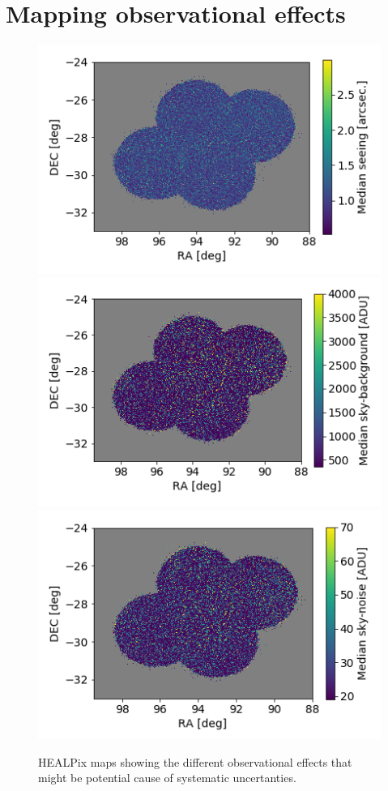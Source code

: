 \documentclass[\docopts]{\docclass}
\begin{document}
\section{Mapping observational effects}
\label{sec:systematic_maps}
\begin{figure}
\centering
\includegraphics[width=0.7\columnwidth]{median_seeing.png}
\includegraphics[width=0.7\columnwidth]{median_skybg.png}
\includegraphics[width=0.7\columnwidth]{median_skynoise.png}
\caption{HEALPix maps showing the different observational effects that might be potential cause of systematic uncertanties.}
\label{fig:systematic_maps}
\end{figure}
\end{document}
